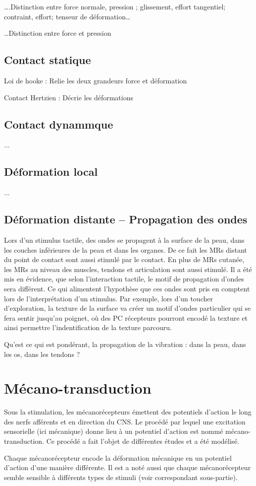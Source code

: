 ….Distinction entre force normale, pression ; glissement, effort tangentiel; contraint, effort; tenseur de déformation…\par
…Distinction entre force et pression\par

\subsection{Contact statique}
Loi de hooke : Relie les deux grandeurs force et déformation\par
Contact Hertzien : Décrie les déformations\par

\subsection{Contact dynammque}
...

\subsection{Déformation local}
...

\subsection{Déformation distante -- Propagation des ondes}
Lors d’un stimulus tactile, des ondes se propagent à la surface de la peau, dans les couches inférieures de la peau et dans les organes. De ce fait les MRs distant du point de contact sont aussi stimulé par le contact. En plus de MRs cutanée, les MRs au niveau des muscles, tendons et articulation sont aussi stimulé. Il a été mis en évidence, que selon l’interaction tactile, le motif de propagation d’ondes sera différent. Ce qui alimentent l’hypothèse que ces ondes sont pris en comptent lors de l’interprétation d’un stimulus. Par exemple, lors d’un toucher d’exploration, la texture de la surface va créer un motif d’ondes particulier qui se fera sentir jusqu’au poignet, où des PC récepteurs pourront encodé la texture et ainsi permettre l’indentification de la texture parcouru.\par

Qu’est ce qui est pondérant, la propagation de la vibration : dans la peau, dans les os, dans les tendons ?\par

\section{Mécano-transduction}
Sous la stimulation, les mécanorécepteurs émettent des potentiels d’action le long des nerfs afférents et en direction du CNS. Le procédé par lequel une excitation sensorielle (ici mécanique) donne lieu à un potentiel d’action est nommé mécano-transduction. Ce procédé a fait l’objet de différentes études et a été modélisé.\par
Chaque mécanorécepteur encode la déformation mécanique en un potentiel d’action d’une manière différente. Il est a noté aussi que chaque mécanorécepteur semble sensible à différents types de stimuli (voir correspondant sous-partie).\par

